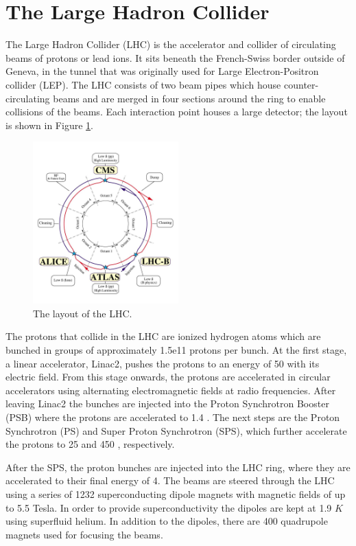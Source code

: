 \section{The Large Hadron Collider}

The Large Hadron Collider (LHC) is the accelerator and collider of circulating beams of protons
or lead ions. 
It sits beneath the French-Swiss border outside of Geneva, in the tunnel that was originally used
for Large Electron-Positron collider (LEP).
 The LHC consists of two beam pipes which house counter-circulating beams and are
merged in four sections around the ring to enable collisions of the beams. Each interaction point
houses a large detector; the layout is shown in Figure \ref{fig:lhc}.

\begin{figure}[htbp]
\centering
\includegraphics[width=0.5\textwidth]{plots/intro/lhc.jpg}
\caption{The layout of the LHC.\label{fig:lhc}}
\end{figure}

The protons that collide in the LHC are ionized hydrogen atoms which are bunched in groups
of approximately 1.5e11 protons per bunch.
At the first stage, a linear accelerator, Linac2, pushes the protons
 to an energy of 50 \MeV with its electric field. 
From this stage onwards, the protons are accelerated in circular accelerators
using alternating electromagnetic fields at radio frequencies. 
After leaving Linac2 the bunches are injected into the Proton Synchrotron
Booster (PSB) where the protons are accelerated to 1.4 \GeV. 
The next steps are the Proton Synchrotron (PS)
and Super Proton Synchrotron (SPS), which further accelerate the protons
 to 25 and 450 \GeV, respectively.

After the SPS, the proton bunches are injected into the LHC ring, 
where they are accelerated to their
final energy of 4\TeV. The beams are steered through the LHC 
using a series of 1232 superconducting dipole magnets with magnetic fields 
of up to 5.5 Tesla. In order to provide superconductivity the 
dipoles are kept at 1.9 $K$ using superfluid helium.
In addition to the dipoles, there are 400 quadrupole magnets used
for focusing the beams.

